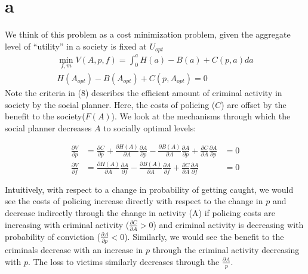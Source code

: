 \documentclass[12pt]{paper}
\begin{document}
\section*{a}
We think of this problem as a cost minimization problem, given the
aggregate level of ``utility'' in a society is fixed at $U_{opt}$
\begin{align}
 \min_{f,m} V(A,p,f) = \int_0^a H(a) - B(a) + C(p,a) da \\
  H(A_{opt}) - B(A_{opt}) + C(p,A_{opt}) = 0
\end{align}
Note the criteria in (8) describes the efficient amount of criminal
activity in society by the social planner. Here, the costs of policing
($C$) are offset by the benefit to the society($F(A)$). We look at the
mechanisms through which the social planner decreases $A$ to socially
optimal levels:


\begin{align*} 
 \frac{\partial V}{\partial p} & = \frac{\partial C}{\partial p} + \frac{\partial{H(A)}}{ \partial{A}} \frac{ \partial{A}}{\partial{p}} - \frac{\partial{B(A)}}{\partial{A}}\frac{\partial{A}}{\partial{p}} + \frac{\partial{C}}{\partial{A}}\frac{\partial{A}}{\partial{p}} &=0\\
  \frac{\partial V}{\partial f} & = \frac{\partial{H(A)}}{\partial{A}} \frac{\partial{A}}{\partial{f}} - \frac{\partial{B(A)}}{\partial{A}}\frac{\partial{A}}{\partial{f}} + \frac{\partial{C}}{\partial{A}}\frac{\partial{A}}{\partial{f}} &= 0
\end{align*}


Intuitively, with respect to a change in probability of getting
caught, we would see the costs of policing increase directly with
respect to the change in $p$ and decrease indirectly through the
change in activity (A) if policing costs are increasing with criminal
activity ($\frac{\partial{C}}{\partial{A}}>0$) and criminal activity is decreasing
with probability of conviction ($\frac{\partial{A}}{\partial{p}}<0$). Similarly, we
would see the benefit to the criminals decrease with an increase in
$p$ through the criminal activity decreasing with $p$. The loss to
victims similarly decreases through the $\frac{\partial{A}}{p}$. \par
\end{document}
